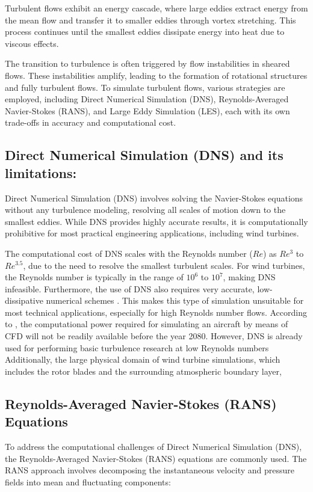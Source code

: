 Turbulent flows exhibit an energy cascade, where large eddies extract energy from the mean flow and transfer it to smaller eddies through vortex stretching. This process continues until the smallest eddies dissipate energy into heat due to viscous effects.

The transition to turbulence is often triggered by flow instabilities in sheared flows. These instabilities amplify, leading to the formation of rotational structures and fully turbulent flows. To simulate turbulent flows, various strategies are employed, including Direct Numerical Simulation (DNS), Reynolds-Averaged Navier-Stokes (RANS), and Large Eddy Simulation (LES), each with its own trade-offs in accuracy and computational cost.

\subsection{Direct Numerical Simulation (DNS) and its limitations:}
Direct Numerical Simulation (DNS) involves solving the Navier-Stokes equations without any turbulence modeling, 
resolving all scales of motion down to the smallest eddies. While DNS provides highly accurate results, 
it is computationally prohibitive for most practical engineering applications, including wind turbines.

The computational cost of DNS scales with the Reynolds number ($Re$) as $Re^{3}$ to $Re^{3.5}$, 
due to the need to resolve the smallest turbulent scales. For wind turbines, the Reynolds number is typically in the range of $10^6$ to $10^7$, 
making DNS infeasible. Furthermore, the use of DNS also requires very accurate, low-dissipative numerical schemes
\cite{mocket2009}. This makes this type of simulation unsuitable for most technical applications,
especially for high Reynolds number flows. According to \cite{spalart2000}, the computational
power required for simulating an aircraft by means of CFD will not be readily available before
the year 2080. However, DNS is already used for performing basic turbulence research at low
Reynolds numbers 
Additionally, the large physical domain of wind turbine simulations, which includes the rotor blades and the surrounding atmospheric boundary layer, 
\subsection{Reynolds-Averaged Navier-Stokes (RANS) Equations}
To address the computational challenges of Direct Numerical Simulation (DNS), the Reynolds-Averaged Navier-Stokes (RANS) equations are commonly used. The RANS approach involves decomposing the instantaneous velocity and pressure fields into mean and fluctuating components:

